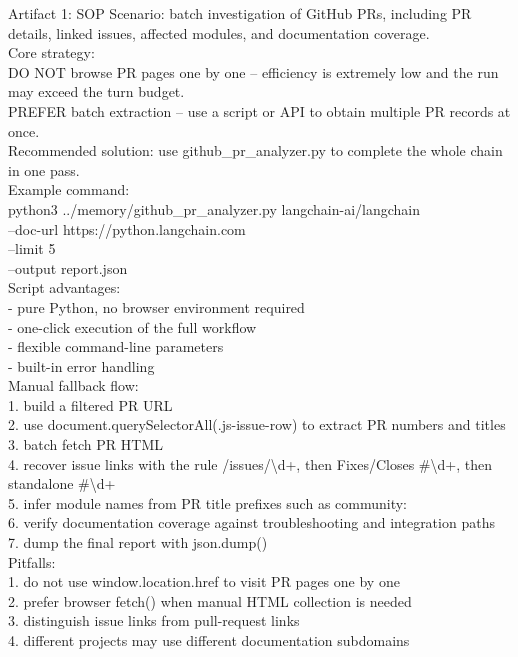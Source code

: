 \begin{CaseTraceBox}{Artifact 1: SOP}
\small\ttfamily
Scenario: batch investigation of GitHub PRs, including PR details, linked issues, affected modules, and documentation coverage. \\
Core strategy: \\
DO NOT browse PR pages one by one -- efficiency is extremely low and the run may exceed the turn budget. \\
PREFER batch extraction -- use a script or API to obtain multiple PR records at once. \\
Recommended solution: use github\_pr\_analyzer.py to complete the whole chain in one pass. \\
Example command: \\
python3 ../memory/github\_pr\_analyzer.py langchain-ai/langchain \\
\quad --doc-url https://python.langchain.com \\
\quad --limit 5 \\
\quad --output report.json \\
Script advantages: \\
- pure Python, no browser environment required \\
- one-click execution of the full workflow \\
- flexible command-line parameters \\
- built-in error handling \\
Manual fallback flow: \\
1. build a filtered PR URL \\
2. use document.querySelectorAll(.js-issue-row) to extract PR numbers and titles \\
3. batch fetch PR HTML \\
4. recover issue links with the rule /issues/\textbackslash d+, then Fixes/Closes \#\textbackslash d+, then standalone \#\textbackslash d+ \\
5. infer module names from PR title prefixes such as community: \\
6. verify documentation coverage against troubleshooting and integration paths \\
7. dump the final report with json.dump() \\
Pitfalls: \\
1. do not use window.location.href to visit PR pages one by one \\
2. prefer browser fetch() when manual HTML collection is needed \\
3. distinguish issue links from pull-request links \\
4. different projects may use different documentation subdomains
\end{CaseTraceBox}

